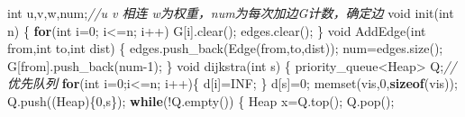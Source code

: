 \documentclass[
]{article}
\newenvironment{Shaded}{}{}
\newcommand{\CommentTok}[1]{\textcolor[rgb]{0.38,0.63,0.69}{\textit{#1}}}
\newcommand{\ControlFlowTok}[1]{\textcolor[rgb]{0.00,0.44,0.13}{\textbf{#1}}}
\newcommand{\DataTypeTok}[1]{\textcolor[rgb]{0.56,0.13,0.00}{#1}}
\newcommand{\DecValTok}[1]{\textcolor[rgb]{0.25,0.63,0.44}{#1}}
\newcommand{\KeywordTok}[1]{\textcolor[rgb]{0.00,0.44,0.13}{\textbf{#1}}}
\newcommand{\NormalTok}[1]{#1}
\newcommand{\OperatorTok}[1]{\textcolor[rgb]{0.40,0.40,0.40}{#1}}
\begin{document}
\begin{Shaded}
\begin{Highlighting}[]
\DataTypeTok{int}\NormalTok{ u}\OperatorTok{,}\NormalTok{v}\OperatorTok{,}\NormalTok{w}\OperatorTok{,}\NormalTok{num}\OperatorTok{;}\CommentTok{//u v 相连 w为权重，num为每次加边G计数，确定边}
\DataTypeTok{void}\NormalTok{ init}\OperatorTok{(}\DataTypeTok{int}\NormalTok{ n}\OperatorTok{)} \OperatorTok{\{}
	\ControlFlowTok{for}\OperatorTok{(}\DataTypeTok{int}\NormalTok{ i}\OperatorTok{=}\DecValTok{0}\OperatorTok{;}\NormalTok{ i}\OperatorTok{\textless{}=}\NormalTok{n}\OperatorTok{;}\NormalTok{ i}\OperatorTok{++)}\NormalTok{ G}\OperatorTok{[}\NormalTok{i}\OperatorTok{].}\NormalTok{clear}\OperatorTok{();}
\NormalTok{	edges}\OperatorTok{.}\NormalTok{clear}\OperatorTok{();}
\OperatorTok{\}}
\DataTypeTok{void}\NormalTok{ AddEdge}\OperatorTok{(}\DataTypeTok{int}\NormalTok{ from}\OperatorTok{,}\DataTypeTok{int}\NormalTok{ to}\OperatorTok{,}\DataTypeTok{int}\NormalTok{ dist}\OperatorTok{)} \OperatorTok{\{}
\NormalTok{	edges}\OperatorTok{.}\NormalTok{push\_back}\OperatorTok{(}\NormalTok{Edge}\OperatorTok{(}\NormalTok{from}\OperatorTok{,}\NormalTok{to}\OperatorTok{,}\NormalTok{dist}\OperatorTok{));}
\NormalTok{	num}\OperatorTok{=}\NormalTok{edges}\OperatorTok{.}\NormalTok{size}\OperatorTok{();}
\NormalTok{	G}\OperatorTok{[}\NormalTok{from}\OperatorTok{].}\NormalTok{push\_back}\OperatorTok{(}\NormalTok{num}\OperatorTok{{-}}\DecValTok{1}\OperatorTok{);}
\OperatorTok{\}}
\DataTypeTok{void}\NormalTok{ dijkstra}\OperatorTok{(}\DataTypeTok{int}\NormalTok{ s}\OperatorTok{)} \OperatorTok{\{}
\NormalTok{	priority\_queue}\OperatorTok{\textless{}}\NormalTok{Heap}\OperatorTok{\textgreater{}}\NormalTok{ Q}\OperatorTok{;}\CommentTok{//优先队列}
	\ControlFlowTok{for}\OperatorTok{(}\DataTypeTok{int}\NormalTok{ i}\OperatorTok{=}\DecValTok{0}\OperatorTok{;}\NormalTok{i}\OperatorTok{\textless{}=}\NormalTok{n}\OperatorTok{;}\NormalTok{ i}\OperatorTok{++)\{}
\NormalTok{		d}\OperatorTok{[}\NormalTok{i}\OperatorTok{]=}\NormalTok{INF}\OperatorTok{;}
	\OperatorTok{\}}
\NormalTok{	d}\OperatorTok{[}\NormalTok{s}\OperatorTok{]=}\DecValTok{0}\OperatorTok{;}
\NormalTok{	memset}\OperatorTok{(}\NormalTok{vis}\OperatorTok{,}\DecValTok{0}\OperatorTok{,}\KeywordTok{sizeof}\OperatorTok{(}\NormalTok{vis}\OperatorTok{));} 
\NormalTok{	Q}\OperatorTok{.}\NormalTok{push}\OperatorTok{((}\NormalTok{Heap}\OperatorTok{)\{}\DecValTok{0}\OperatorTok{,}\NormalTok{s}\OperatorTok{\});}
	\ControlFlowTok{while}\OperatorTok{(!}\NormalTok{Q}\OperatorTok{.}\NormalTok{empty}\OperatorTok{())} \OperatorTok{\{}
\NormalTok{		Heap x}\OperatorTok{=}\NormalTok{Q}\OperatorTok{.}\NormalTok{top}\OperatorTok{();}
\NormalTok{		Q}\OperatorTok{.}\NormalTok{pop}\OperatorTok{();}

\end{Highlighting}
\end{Shaded}
\end{document}
